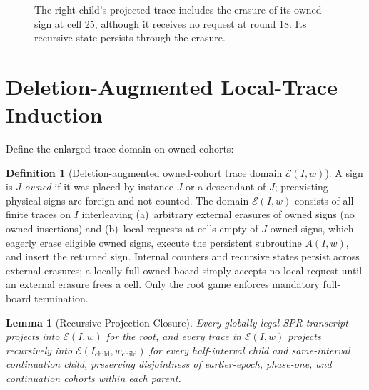 \documentclass[11pt,letterpaper]{article}
\newtheorem{lemma}[theorem]{Lemma}
\theoremstyle{definition}
\newtheorem{definition}[theorem]{Definition}
\theoremstyle{remark}
\newcommand{\cE}{\mathcal{E}}
\begin{document}
\begin{figure}[!htbp]
\centering
{}
\caption{The right child's projected trace includes the erasure of its owned sign at cell 25, although it receives no request at round 18. Its recursive state persists through the erasure.}
\label{fig:trace-erasure}
\end{figure}

\section{Deletion-Augmented Local-Trace Induction}
Define the enlarged trace domain on owned cohorts:

\begin{definition}[Deletion-augmented owned-cohort trace domain $\cE(I,w)$]\label{def:E-domain}
A sign is $J$-\emph{owned} if it was placed by instance $J$ or a descendant of $J$; preexisting physical signs are foreign and not counted. The domain $\cE(I,w)$ consists of all finite traces on $I$ interleaving (a)~arbitrary external erasures of owned signs (no owned insertions) and (b)~local requests at cells empty of $J$-owned signs, which eagerly erase eligible owned signs, execute the persistent subroutine $A(I,w)$, and insert the returned sign. Internal counters and recursive states persist across external erasures; a locally full owned board simply accepts no local request until an external erasure frees a cell. Only the root game enforces mandatory full-board termination.
\end{definition}

\begin{lemma}[Recursive Projection Closure]\label{lem:projection}
Every globally legal SPR transcript projects into $\cE(I,w)$ for the root, and every trace in $\cE(I,w)$ projects recursively into $\cE(I_{\mathrm{child}}, w_{\mathrm{child}})$ for every half-interval child and same-interval continuation child, preserving disjointness of earlier-epoch, phase-one, and continuation cohorts within each parent.
\end{lemma}
\end{document}
